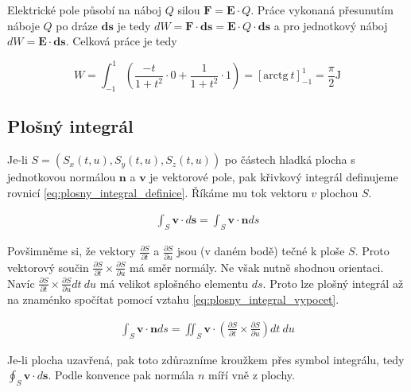 \documentclass{book}
\newcommand{\vect}[1]{\boldsymbol{#1}}
\begin{document}
Elektrické pole působí na náboj \(Q\) silou \(\vect{F} = \vect{E} \cdot Q\). Práce vykonaná přesunutím náboje \(Q\) po dráze \(\vect{ds}\) je tedy \(dW = \vect{F} \cdot \vect{ds} = \vect{E} \cdot Q \cdot \vect{ds}\) a pro jednotkový náboj \(dW = \vect{E} \cdot \vect{ds}\). Celková práce je tedy

\[
W = \int_{-1}^1 \left (\frac{-t}{1 + t^2} \cdot 0 + \frac{1}{1 + t^2} \cdot 1 \right) = \left[\mathrm{arctg} \ t\right]_{-1}^1 = \frac{\pi}{2} \mathrm{J}
\]


\subsection{Plošný integrál}

Je-li \(S = \left(S_x(t, u), S_y(t, u), S_z(t, u)\right)\) po částech hladká plocha s jednotkovou normálou \(\vect{n}\) a \(\vect{v}\) je vektorové pole,
pak křivkový integrál definujeme rovnicí \eqref{eq:plosny_integral_definice}. Říkáme mu tok vektoru \(v\) plochou \(S\).


\begin{equation}
\label{eq:plosny_integral_definice}
\begin{split}
\int_S \vect{v} \cdot d\vect{s} = \int_S \vect{v} \cdot \vect{n} ds
\end{split}
\end{equation}


Povšimněme si, že vektory \(\frac{\partial S}{\partial t}\) a \(\frac{\partial S}{\partial u}\) jsou (v daném bodě) tečné k ploše \(S\). Proto vektorový součin \(\frac{\partial S}{\partial t} \times \frac{\partial S}{\partial u}\) má směr normály. Ne však nutně shodnou orientaci. Navíc \(\frac{\partial S}{\partial t} \times \frac{\partial S}{\partial u} dt \ du\) má velikot splošného elementu \(ds\). Proto lze plošný integrál až na znaménko spočítat pomocí vztahu \eqref{eq:plosny_integral_vypocet}.

\begin{equation}
\label{eq:plosny_integral_vypocet}
\begin{split}
\int_S \vect{v} \cdot \vect{n} ds = \iint_S \vect{v} \cdot \left (\frac{\partial S}{\partial t} \times \frac{\partial S}{\partial u}\right) dt \ du
\end{split}
\end{equation}

Je-li plocha uzavřená, pak toto zdůrazníme kroužkem přes symbol integrálu, tedy \(\oint_S \vect{v} \cdot d\vect{s}\). Podle konvence pak normála \(n\) míří vně z plochy.
\end{document}
